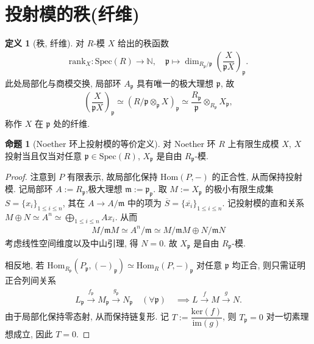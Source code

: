 \documentclass{MainStyle}
\theoremstyle{definition}
\theoremstyle{definition}
\theoremstyle{definition}
\newtheorem{definition}{定义}
\theoremstyle{definition}
\newtheorem{proposition}{命题}
\theoremstyle{definition}
\theoremstyle{definition}
\theoremstyle{definition}
\theoremstyle{remark}
\theoremstyle{remark}
\begin{document}
\maketitle
\tableofcontents

\section{投射模的秩(纤维)}

\begin{definition}[秩, 纤维]
    对 $R$-模 $X$ 给出的秩函数
    \begin{align*}
        \mathrm{rank}_{X}:\mathrm{Spec}(R)\to \mathbb N, \quad \mathfrak p\mapsto \dim_{R_{\mathfrak p}/\mathfrak p}\left(\dfrac{X}{\mathfrak p X}\right)_{\mathfrak p}.
    \end{align*}
    此处局部化与商模交换, 局部环 $A_{\mathfrak p}$ 具有唯一的极大理想 $\mathfrak p$, 故
    \begin{align*}
        \left(\dfrac{X}{\mathfrak p X}\right)_{\mathfrak p}\simeq (R/\mathfrak p\otimes _{\mathfrak p}X)_{\mathfrak p}\simeq \dfrac{R_{\mathfrak p}}{\mathfrak p}\otimes_{R_{\mathfrak p}} X_{\mathfrak p},
    \end{align*}
    称作 $X$ 在 $\mathfrak p$ 处的纤维.
\end{definition}

\begin{proposition}[Noether 环上投射模的等价定义]\label{noether-proj-freerank}
    对 Noether 环 $R$ 上有限生成模 $X$, $X$ 投射当且仅当对任意 $\mathfrak p\in \mathrm{Spec}(R)$, $X_{\mathfrak p}$ 是自由 $R_{\mathfrak p}$-模.
    \begin{proof}
        注意到 $P$ 有限表示, 故局部化保持 $\mathrm{Hom}(P,-)$ 的正合性, 从而保持投射模. 记局部环 $A:=R_{\mathfrak p}$,极大理想 $\mathfrak m:=\mathfrak p_{\mathfrak p}$. 取 $M:=X_{\mathfrak p}$ 的极小有限生成集 $S=\{x_i\}_{1\leq i\leq n}$, 其在 $A\to A/\mathfrak m$ 中的项为 $\overline S=\{\overline{x_i}\}_{1\leq i\leq n}$. 记投射模的直和关系 $M\oplus N\simeq A^n\simeq \bigoplus_{1\leq i\leq n}Ax_i$. 从而
        \begin{align*}
            M/\mathfrak mM\simeq A^n/\mathfrak m\simeq M/\mathfrak m M\oplus N/\mathfrak mN
        \end{align*}
        考虑线性空间维度以及中山引理, 得 $N=0$. 故 $X_{\mathfrak p}$ 是自由 $R_\mathfrak p$-模.\par
        相反地, 若 $\mathrm{Hom}_{R_{\mathfrak p}}(P_{\mathfrak p},(-)_{\mathfrak p})\simeq \mathrm{Hom}_R(P,-)_{\mathfrak p}$ 对任意 $\mathfrak p$ 均正合, 则只需证明正合列间关系
        \begin{align*}
            L_\mathfrak p\overset{f_\mathfrak p}\longrightarrow M_\mathfrak p\overset{g_\mathfrak p}\longrightarrow N_\mathfrak p \quad (\forall \mathfrak p)\quad \implies L\overset f\longrightarrow M\overset g\longrightarrow N.
        \end{align*}
        由于局部化保持零态射, 从而保持链复形. 记 $T:=\dfrac{\mathrm{ker}(f)}{\mathrm{im}(g)}$, 则 $T_{\mathfrak p}=0$ 对一切素理想成立, 因此 $T=0$.
    \end{proof}
\end{proposition}
\end{document}
